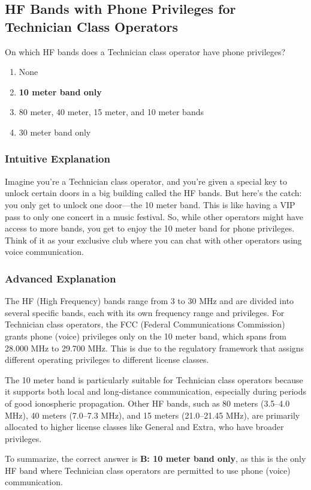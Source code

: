 \subsection{HF Bands with Phone Privileges for Technician Class Operators}
\label{T1B06}

\begin{tcolorbox}[colback=gray!10!white,colframe=black!75!black,title=T1B06]
On which HF bands does a Technician class operator have phone privileges?
\begin{enumerate}[label=\Alph*)]
    \item None
    \item \textbf{10 meter band only}
    \item 80 meter, 40 meter, 15 meter, and 10 meter bands
    \item 30 meter band only
\end{enumerate}
\end{tcolorbox}

\subsubsection{Intuitive Explanation}
Imagine you’re a Technician class operator, and you’re given a special key to unlock certain doors in a big building called the HF bands. But here’s the catch: you only get to unlock one door—the 10 meter band. This is like having a VIP pass to only one concert in a music festival. So, while other operators might have access to more bands, you get to enjoy the 10 meter band for phone privileges. Think of it as your exclusive club where you can chat with other operators using voice communication.

\subsubsection{Advanced Explanation}
The HF (High Frequency) bands range from 3 to 30 MHz and are divided into several specific bands, each with its own frequency range and privileges. For Technician class operators, the FCC (Federal Communications Commission) grants phone (voice) privileges only on the 10 meter band, which spans from 28.000 MHz to 29.700 MHz. This is due to the regulatory framework that assigns different operating privileges to different license classes.

The 10 meter band is particularly suitable for Technician class operators because it supports both local and long-distance communication, especially during periods of good ionospheric propagation. Other HF bands, such as 80 meters (3.5–4.0 MHz), 40 meters (7.0–7.3 MHz), and 15 meters (21.0–21.45 MHz), are primarily allocated to higher license classes like General and Extra, who have broader privileges.

To summarize, the correct answer is \textbf{B: 10 meter band only}, as this is the only HF band where Technician class operators are permitted to use phone (voice) communication.

